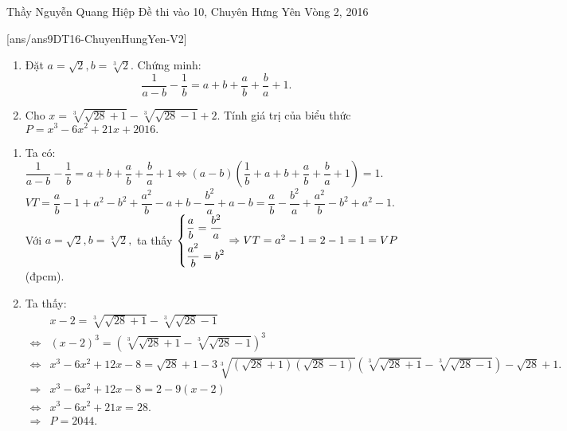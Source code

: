 \begin{name}
{Thầy  Nguyễn Quang Hiệp}
{Đề thi vào 10, Chuyên Hưng Yên Vòng 2, 2016}
\end{name}
\setcounter{ex}{0}
[ans/ans9DT16-ChuyenHungYen-V2]
\begin{ex}%
    \hfill
    \begin{enumerate}
        \item Đặt $ a=\sqrt{2},b=\sqrt[3]{2}. $ Chứng minh: 
        $$\dfrac{1}{a-b}-\dfrac{1}{b}=a+b+\dfrac{a}{b}+\dfrac{b}{a}+1.$$
        \item Cho $ x=\sqrt[3]{\sqrt{28}+1}-\sqrt[3]{\sqrt{28}-1}+2. $ Tính giá trị của biểu thức $ P=x^3-6x^2+21x+2016. $
    \end{enumerate}
\loigiai
    {
    	\begin{enumerate}
    		\item Ta có: $\dfrac{1}{a-b}-\dfrac{1}{b}=a+b+\dfrac{a}{b}+\dfrac{b}{a}+1 \Leftrightarrow (a-b)\left(\dfrac{1}{b}+a+b+\dfrac{a}{b}+\dfrac{b}{a}+1\right)=1.$	\\
 			$ VT= \dfrac{a}{b}-1+a^2-b^2+\dfrac{a^2}{b}-a+b-\dfrac{b^2}{a}+a-b=\dfrac{a}{b}-\dfrac{b^2}{a}+\dfrac{a^2}{b}-b^2+a^2-1.$\\
 			Với $ a=\sqrt{2},b=\sqrt[3]{2}, $  ta thấy 
 			$ \left\{\begin{aligned}
 				&\dfrac{a}{b}=\dfrac{b^2}{a}\\
 				&\dfrac{a^2}{b}=b^2
 				\end{aligned}\right. \Rightarrow VT= a^2-1=2-1=1=VP
 			 $(đpcm).
 			\item 	Ta thấy:
 			{\allowdisplaybreaks
 			\begin{align*}
 					 &x-2= \sqrt[3]{\sqrt{28}+1}-\sqrt[3]{\sqrt{28}-1}\\
 					 \Leftrightarrow &(x-2)^3=(\sqrt[3]{\sqrt{28}+1}-\sqrt[3]{\sqrt{28}-1})^3\\
 					 \Leftrightarrow &x^3-6x^2+12x-8=\sqrt{28}+1 -3\sqrt[3]{(\sqrt{28}+1)(\sqrt{28}-1)}(\sqrt[3]{\sqrt{28}+1}-\sqrt[3]{\sqrt{28}-1})-\sqrt{28}+1.\\
 					 \Rightarrow &x^3-6x^2+12x-8=2-9(x-2) \\
 					 \Leftrightarrow &x^3-6x^2+21x=28.\\
 					 \Rightarrow &P=2044. 				 					
 			\end{align*}}
    		
    	\end{enumerate}
    
    }
\end{ex}

